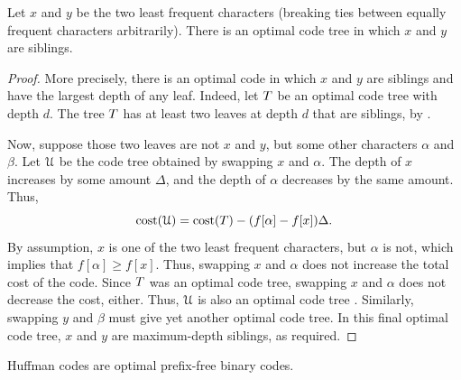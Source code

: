 \begin{lemma}
    Let $x$ and $y$ be the two least frequent characters (breaking
    ties between equally frequent characters arbitrarily). There is an
    optimal code tree in which $x$ and $y$ are siblings.
\end{lemma}

\begin{proof}
    More precisely, there is an optimal code in which $x$ and $y$ are
    siblings and have the largest depth of any leaf.  Indeed, let
    $T$ be an optimal code tree with depth $d$. The tree $T$
    has at least two leaves at depth $d$ that are siblings, by
    .

    Now, suppose those two leaves are not $x$ and $y$, but some other
    characters $\alpha$ and $\beta$.  Let $\EuScript{U}$ be the code tree
    obtained by swapping $x$ and $\alpha$. The depth of $x$ increases
    by some amount $\Delta$, and the depth of $\alpha$ decreases by
    the same amount. Thus,
    \begin{equation*}
    \costX{\TreeA} = \costX{\Tree} - \pth{\MakeSBig f[\alpha ] - f[ x
       ]}\Delta.
    \end{equation*}
    By assumption, $x$ is one of the two least frequent characters,
    but $\alpha$ is not, which implies that $f[\alpha] \geq f[x]$. Thus,
    swapping $x$ and $\alpha$ does not increase the total cost of the
    code. Since $T$ was an optimal code tree, swapping $x$ and
    $\alpha$ does not decrease the cost, either. Thus, $\EuScript{U}$ is
    also an optimal code tree .  Similarly, swapping $y$ and $\beta$ must give yet another
    optimal code tree. In this final optimal code tree, $x$ and $y$ are
    maximum-depth siblings, as required.
\end{proof}

\begin{theorem}
    Huffman codes are optimal prefix-free binary codes.
\end{theorem}

